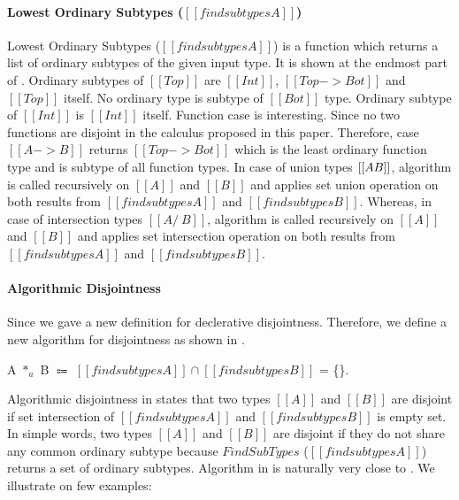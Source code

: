 \paragraph{Lowest Ordinary Subtypes ($[[findsubtypes A]]$)}
Lowest Ordinary Subtypes ($[[findsubtypes A]]$) is a function which returns a list of ordinary subtypes
of the given input type. It is shown at the endmost part of .
Ordinary subtypes of $[[Top]]$ are $[[Int]]$, $[[Top -> Bot]]$ and $[[Top]]$ itself.
No ordinary type is subtype of $[[Bot]]$ type. Ordinary subtype of $[[Int]]$ is $[[Int]]$ itself.
Function case is interesting. Since no two functions are disjoint in the calculus proposed in this paper.
Therefore, case $[[A -> B]]$ returns $[[Top -> Bot]]$ which is the least ordinary function type
and is subtype of all function types. In case of union types $[[A \/ B]]$, algorithm is called recursively on
$[[A]]$ and $[[B]]$ and applies set union operation on both results from  $[[findsubtypes A]]$ and
$[[findsubtypes B]]$. Whereas, in case of intersection types $[[A /\ B]]$, algorithm is called recursively on
$[[A]]$ and $[[B]]$ and applies set intersection operation on both results from  $[[findsubtypes A]]$ and
$[[findsubtypes B]]$.

\paragraph{Algorithmic Disjointness}
Since we gave a new definition for declerative disjointness.
Therefore, we define a new algorithm for disjointness as shown in .

\begin{definition}
\label{def:inter:ad}
  A $*_a$ B $\Coloneqq$  $ [[findsubtypes A]] \cap [[findsubtypes B]] $ = \{\}.
\end{definition}

\noindent Algorithmic disjointness in  states that two types $[[A]]$ and $[[B]]$
are disjoint
if set intersection of $[[findsubtypes A]]$ and $[[findsubtypes B]]$ is empty set. In simple words,
two types $[[A]]$ and $[[B]]$ are disjoint if they do not share any common ordinary subtype because
$FindSubTypes$ ($[[findsubtypes A]]$) returns a set of ordinary subtypes. Algorithm in 
is naturally very close to . We illustrate  on few examples:

